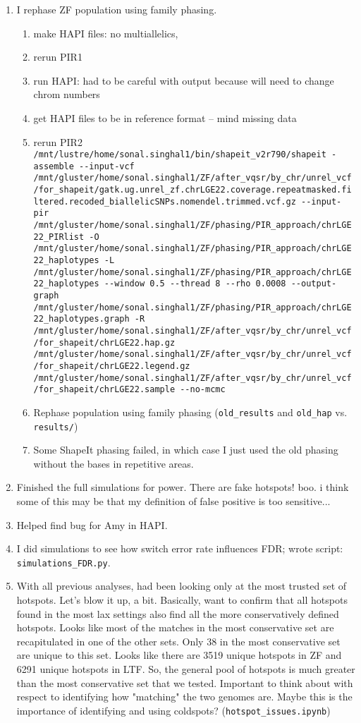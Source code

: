\documentclass[idxtotoc,hyperref,openany,oneside]{labbook} %
\begin{document}
\begin{enumerate}
\begin{enumerate}
 \end{enumerate}
 \item I rephase ZF population using family phasing.
 \begin{enumerate}
 	\item make HAPI files: no multiallelics, 
 	\item rerun PIR1
 	\item run HAPI: had to be careful with output because will need to change chrom numbers
 	\item get HAPI files to be in reference format -- mind missing data
	\item rerun PIR2
 	\verb+/mnt/lustre/home/sonal.singhal1/bin/shapeit_v2r790/shapeit -assemble --input-vcf /mnt/gluster/home/sonal.singhal1/ZF/after_vqsr/by_chr/unrel_vcf/for_shapeit/gatk.ug.unrel_zf.chrLGE22.coverage.repeatmasked.filtered.recoded_biallelicSNPs.nomendel.trimmed.vcf.gz --input-pir /mnt/gluster/home/sonal.singhal1/ZF/phasing/PIR_approach/chrLGE22_PIRlist -O /mnt/gluster/home/sonal.singhal1/ZF/phasing/PIR_approach/chrLGE22_haplotypes -L /mnt/gluster/home/sonal.singhal1/ZF/phasing/PIR_approach/chrLGE22_haplotypes --window 0.5 --thread 8 --rho 0.0008 --output-graph /mnt/gluster/home/sonal.singhal1/ZF/phasing/PIR_approach/chrLGE22_haplotypes.graph -R /mnt/gluster/home/sonal.singhal1/ZF/after_vqsr/by_chr/unrel_vcf/for_shapeit/chrLGE22.hap.gz /mnt/gluster/home/sonal.singhal1/ZF/after_vqsr/by_chr/unrel_vcf/for_shapeit/chrLGE22.legend.gz /mnt/gluster/home/sonal.singhal1/ZF/after_vqsr/by_chr/unrel_vcf/for_shapeit/chrLGE22.sample --no-mcmc+
 	\item Rephase population using family phasing (\verb+old_results+ and \verb+old_hap+ vs. \verb+results/+)
 	\item Some ShapeIt phasing failed, in which case I just used the old phasing without the bases in repetitive areas.
 \end{enumerate}
\item Finished the full simulations for power. There are fake hotspots! boo. i think some of this may be that my definition of false positive is too sensitive...
\item Helped find bug for Amy in HAPI.
\item I did simulations to see how switch error rate influences FDR; wrote script: \verb+simulations_FDR.py+.
\item With all previous analyses, had been looking only at the most trusted set of hotspots. Let's blow it up, a bit. Basically, want to confirm that all hotspots found in the most lax settings also find all the more conservatively defined hotspots. Looks like most of the matches in the most conservative set are recapitulated in one of the other sets. Only 38 in the most conservative set are unique to this set. Looks like there are 3519 unique hotspots in ZF and 6291 unique hotspots in LTF. So, the general pool of hotspots is much greater than the most conservative set that we tested. Important to think about with respect to identifying how "matching" the two genomes are. Maybe this is the importance of identifying and using coldspots? (\verb+hotspot_issues.ipynb+)

\end{enumerate}
\end{document}
